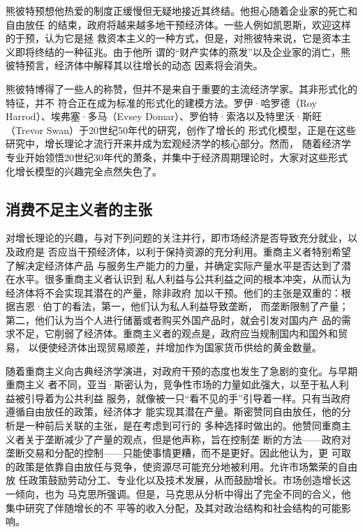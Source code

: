 熊彼特预想他热爱的制度正缓慢但无疑地接近其终结。他担心随着企业家的死亡和自由放任
的结束，政府将越来越多地干预经济体。一些人例如凯恩斯，欢迎这样的于预，认为它是拯
救资本主义的一种方式，但是，对熊彼特来说，它是资本主义即将终结的一种征兆。由于他所
谓的“财产实体的燕发”以及企业家的消亡，熊彼特预言，经济体中解释其以往增长的动态
因素将会消失。

熊彼特博得了一些人的称赞，但并不是来自于重要的主流经济学家。其非形式化的特征，并不
符合正在成为标准的形式化的建模方法。罗伊·哈罗德（Roy Harrod）、埃弗塞·多马（Evsey
Domar）、罗伯特·索洛以及特里沃·斯旺（Trevor Swan）于20世纪50年代的研究，创作了增长的
形式化模型，正是在这些研究中，增长理论才流行开来并成为宏观经济学的核心部分。然而，
随着经济学专业开始领悟20世纪30年代的萧条，并集中于经济周期理论时，大家对这些形式
化增长模型的兴趣完全点然失色了。

\subsection{消费不足主义者的主张}

对增长理论的兴趣，与对下列问题的关注并行，即市场经济是否导致充分就业，以及政府是
否应当干预经济体，以利于保持资源的充分利用。重商主义者特别希望了解决定经济体产品
与服务生产能力的力量，并确定实际产量水平是否达到了潜在水平。很多重商主义者认识到
私人利益与公共利益之间的根本冲突，从而认为经济体将不会实现其潜在的产量，除非政府
加以干预。他们的主张是双重的：根据吉恩·伯丁的看法，第一，他们认为私人利益导致垄断，
而垄断限制了产量；第二，他们认为当个人进行储蓄或者购买外国产品时，就会引发对国内产
品的需求不足，它削弱了经济体。重商主义者的观点是，政府应当规制国内和国外和贸易，
以便使经济体出现贸易顺差，并增加作为国家货币供给的黄金数量。

随着重商主义向古典经济学演进，对政府干预的态度也发生了急剧的变化。与早期重商主义
者不同，亚当·斯密认为，竞争性市场的力量如此强大，以至于私人利益被引导着为公共利益
服务，就像被一只“看不见的手”引导着一样。只有当政府遵循自由放任的政策，经济体才
能实现其潜在产量。斯密赞同自由放任，他的分析是一种前后关联的主张，是在考虑到可行的
多种选择时做出的。他赞同重商主义者关于垄断减少了产量的观点，但是他声称，旨在控制垄
断的方法——政府对垄断交易和分配的控制——只能使事情更糟，而不是更好。因此他认为，更
可取的政策是依靠自由放任与竞争，使资源尽可能充分地被利用。允许市场繁荣的自由放
任政策鼓励劳动分工、专业化以及技术发展，从而鼓励增长。市场创造增长这一倾向，也为
马克思所强调。但是，马克思从分析中得出了完全不同的合义，他集中研究了伴随增长的不
平等的收入分配，及其对政治结构和社会结构的可能影响。

